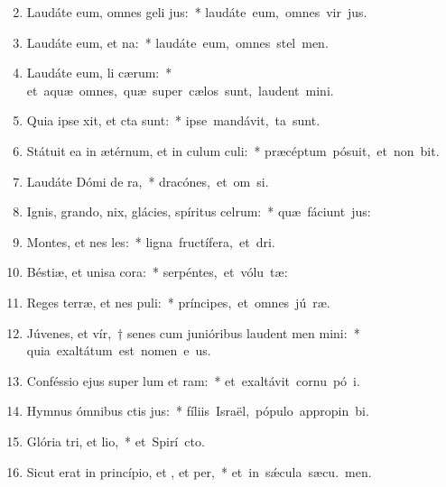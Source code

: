 \begin{flushleft}
\begin{enumerate}[leftmargin=*]
\setcounter{enumi}{1}


\item Laudáte eum, omnes geli jus:~* \mbox{laudáte eum, omnes vir jus.}
\item Laudáte eum,  et na:~* \mbox{laudáte eum, omnes stel  men.}
\item Laudáte eum, li cærum:~* \mbox{et aquæ omnes, quæ super cælos sunt, laudent  mini.}
\item Quia ipse xit, et cta sunt:~* \mbox{ipse mandávit,  ta sunt.}
\item Státuit ea in ætérnum, et in culum culi:~* \mbox{præcéptum pósuit, et non bit.}
\item Laudáte Dómi de ra,~* \mbox{dracónes, et om si.}
\item Ignis, grando, nix, glácies, spíritus celrum:~* \mbox{quæ fáciunt  jus:}
\item Montes, et nes les:~* \mbox{ligna fructífera, et  dri.}
\item Béstiæ, et unisa cora:~* \mbox{serpéntes, et vólu tæ:}
\item Reges terræ, et nes puli:~* \mbox{príncipes, et omnes jú ræ.}
\item Júvenes, et vír,~† senes cum junióribus laudent men mini:~* \mbox{quia exaltátum est nomen e us.}
\item Conféssio ejus super lum et ram:~* \mbox{et exaltávit cornu pó i.}
\item Hymnus ómnibus ctis jus:~* \mbox{fíliis Israël, pópulo appropin bi.}
\item Glória tri, et lio,~* \mbox{et Spirí cto.}
\item Sicut erat in princípio, et , et per,~* \mbox{et in s\'{\ae}cula sæcu. men.}

\end{enumerate}
\end{flushleft}

